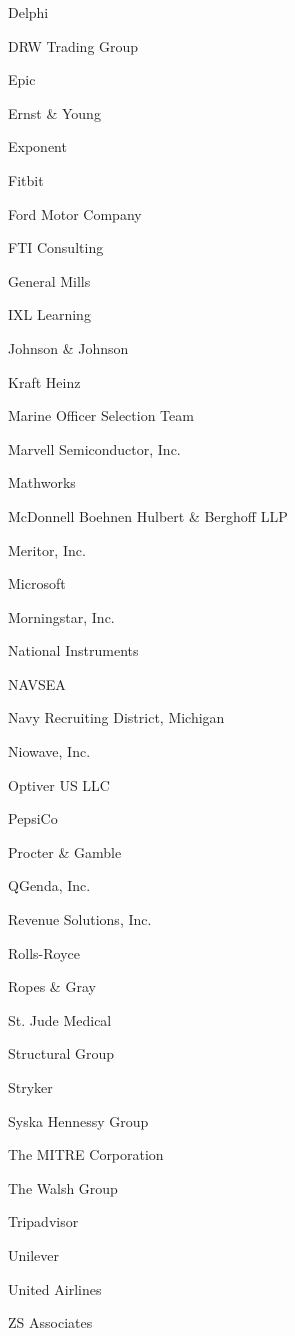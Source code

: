 \documentclass[twoside]{article}
\begin{document}
\begin{center}
\begin{multicols}{5}
\begin{FlushLeft}
\begin{compactitem}
\item Delphi
\item DRW Trading Group
\item Epic
\item Ernst \& Young
\item Exponent
\item Fitbit
\item Ford Motor Company
\item FTI Consulting
\item General Mills
\item IXL Learning
\item Johnson \& Johnson
\item Kraft Heinz
\item Marine Officer Selection Team
\item Marvell Semiconductor, Inc.
\item Mathworks
\item McDonnell Boehnen Hulbert \& Berghoff LLP
\item Meritor, Inc.
\item Microsoft
\item Morningstar, Inc.
\item National Instruments
\item NAVSEA
\item Navy Recruiting District, Michigan
\item Niowave, Inc.
\item Optiver US LLC
\item PepsiCo
\item Procter \& Gamble
\item QGenda, Inc.
\item Revenue Solutions, Inc.
\item Rolls-Royce
\item Ropes \& Gray
\item St. Jude Medical
\item Structural Group
\item Stryker
\item Syska Hennessy Group
\item The MITRE Corporation
\item The Walsh Group
\item Tripadvisor
\item Unilever
\item United Airlines
\item ZS Associates
\end{compactitem}
        \end{FlushLeft}

\end{multicols}
\end{center}
\end{document}
